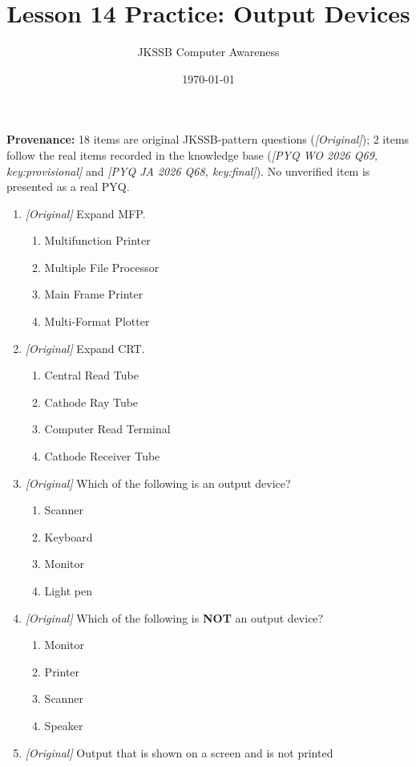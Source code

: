 \documentclass[11pt]{article}
\title{Lesson 14 Practice: Output Devices}
\author{JKSSB Computer Awareness}
\date{\today}
\begin{document}
\maketitle
\noindent\textbf{Provenance:} 18 items are original JKSSB-pattern questions
(\textit{[Original]}); 2 items follow the real items recorded in the knowledge
base (\textit{[PYQ WO 2026 Q69, key:provisional]} and
\textit{[PYQ JA 2026 Q68, key:final]}). No unverified item is presented as a
real PYQ.

\begin{enumerate}[label=\textbf{Q\arabic*.}, leftmargin=*]
\item \textit{[Original]} Expand MFP.
  \begin{enumerate}[label=\Alph*.]
    \item Multifunction Printer
    \item Multiple File Processor
    \item Main Frame Printer
    \item Multi-Format Plotter
  \end{enumerate}
\item \textit{[Original]} Expand CRT.
  \begin{enumerate}[label=\Alph*.]
    \item Central Read Tube
    \item Cathode Ray Tube
    \item Computer Read Terminal
    \item Cathode Receiver Tube
  \end{enumerate}
\item \textit{[Original]} Which of the following is an output device?
  \begin{enumerate}[label=\Alph*.]
    \item Scanner
    \item Keyboard
    \item Monitor
    \item Light pen
  \end{enumerate}
\item \textit{[Original]} Which of the following is \textbf{NOT} an output
  device?
  \begin{enumerate}[label=\Alph*.]
    \item Monitor
    \item Printer
    \item Scanner
    \item Speaker
  \end{enumerate}
\item \textit{[Original]} Output that is shown on a screen and is not printed

\end{enumerate}
\end{document}
